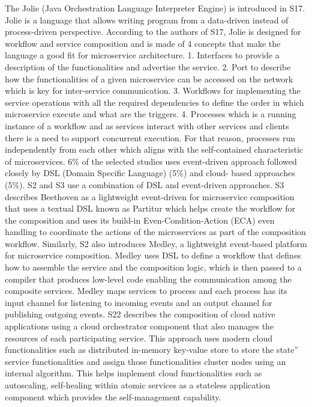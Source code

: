 \documentclass{article}
\begin{document}
\begin{multicols}{2}
The Jolie (Java Orchestration Language Interpreter Engine) is introduced in S17. Jolie is a language that allows writing program from a data-driven instead of process-driven perspective. According to the authors of S17, Jolie is designed for workflow and service composition and is made of 4 concepts that make the language a good fit for microservice architecture. 1. Interfaces to provide a description of the functionalities and advertise the service. 2. Port to describe how the functionalities of a given microservice can be accessed on the network which is key for inter-service communication. 3. Workflows for implementing the service operations with all the required dependencies to define the order in which microservice execute and what are the triggers. 4. Processes which is a running instance of a workflow and as services interact with other services and clients there is a need to support concurrent execution. For that reason, processes run independently from each other which aligns with the self-contained characteristic of microservices. 6\% of the selected studies uses event-driven approach followed closely by DSL (Domain Specific Language) (5\%) and cloud- based approaches (5\%). S2 and S3 use a combination of DSL and event-driven approaches. S3 describes Beethoven as a lightweight event-driven for microservice composition that uses a textual DSL known as Partitur which helps create the workflow for the composition and uses its build-in Even-Condition-Action (ECA) even handling to coordinate the actions of the microservices as part of the composition workflow. Similarly, S2 also introduces Medley, a lightweight event-based platform for microservice composition. Medley uses DSL to define a workflow that defines how to assemble the service and the composition logic, which is then passed to a compiler that produces low-level code enabling the communication among the composite services. Medley maps services to process and each process has its input channel for listening to incoming events and an output channel for publishing outgoing events. S22 describes the composition of cloud native applications using a cloud orchestrator component that also manages the resources of each participating service. This approach uses modern cloud functionalities such as distributed in-memory key-value store to store the state” service functionalities and assign those functionalities cluster nodes using an internal algorithm. This helps implement cloud functionalities such as autoscaling, self-healing within atomic services as a stateless application component which provides the self-management capability. 

\end{multicols}
\end{document}
